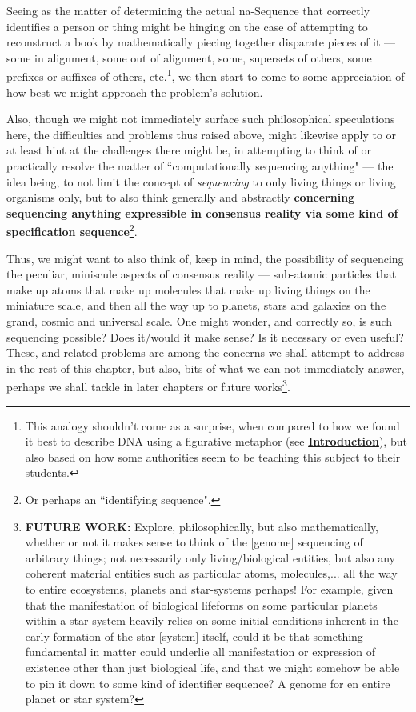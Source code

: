 \documentclass[a4paper, 18pt]{article} %
\begin{document}
Seeing as the matter of determining the actual na-Sequence that correctly identifies a person or thing might be hinging on the case of attempting to reconstruct a book by mathematically piecing together disparate pieces of it --- some in alignment, some out of alignment, some, supersets of  others, some prefixes or suffixes of others, etc.\footnote{This analogy shouldn't come as a surprise, when compared to how we found it best to describe DNA using a figurative metaphor (see \textbf{\hyperref[SEC1]{Introduction}}), but also based on how some authorities seem to be teaching this subject to their students\cite{przytycka_wgs_lecture10}.}, we then start to come to some appreciation of how best we might approach the problem's solution. 


Also, though we might not immediately surface such philosophical speculations here, the difficulties and problems thus raised above, might likewise apply to or at least hint at the challenges there might be, in attempting to think of or practically resolve the matter of ``computationally sequencing anything" --- the idea being, to not limit the concept of \textit{sequencing} to only living things or living organisms only, but to also think generally and abstractly \textbf{concerning sequencing anything expressible in consensus reality via some kind of specification sequence}\footnote{Or perhaps an ``identifying sequence".}. 


Thus, we might want to also think of, keep in mind, the possibility of sequencing the peculiar, miniscule aspects of consensus reality --- sub-atomic particles that make up atoms that make up molecules that make up living things on the miniature scale, and then all the way up to planets, stars and galaxies on the grand, cosmic and universal scale. One might wonder, and correctly so, is such sequencing possible? Does it/would it make sense? Is it necessary or even useful? These, and related problems are among the concerns we shall attempt to address in the rest of this chapter, but also, bits of what we can not immediately answer, perhaps we shall tackle in later chapters or future works\footnote{\textbf{FUTURE WORK:} Explore, philosophically, but also mathematically, whether or not it makes sense to think of the [genome] sequencing of arbitrary things; not necessarily only living/biological entities, but also any coherent material entities such as particular atoms, molecules,... all the way to entire ecosystems, planets and star-systems perhaps! For example, given that the manifestation of biological lifeforms on some particular planets within a star system heavily relies on some initial conditions inherent in the early formation of the star [system] itself, could it be that something fundamental in matter could underlie all manifestation or expression of existence other than just biological life, and that we might somehow be able to pin it down to some kind of identifier sequence? A genome for en entire planet or star system?}.
\end{document}
